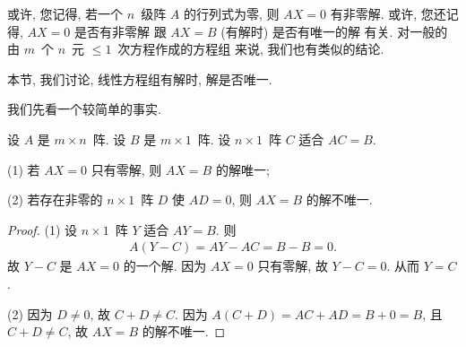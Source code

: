 或许, 您记得,
若一个 \(n\)~级阵 \(A\) 的行列式为零,
则 \(AX = 0\) 有非零解.
或许, 您还记得,
\(AX = 0\) 是否有非零解%
跟 \(AX = B\) (有解时) 是否有唯一的解%
有关.
对一般的%
由 \(m\)~个 \(n\)~元 \({\leq} 1\)~次方程作成的方程组%
来说, 我们也有类似的结论.

本节, 我们讨论, 线性方程组有解时, 解是否唯一.

我们先看一个较简单的事实.

\begin{theorem}
    设 \(A\) 是 \(m \times n\)~阵.
    设 \(B\) 是 \(m \times 1\)~阵.
    设 \(n \times 1\)~阵 \(C\) 适合 \(AC = B\).

    (1)
    若 \(AX = 0\) 只有零解, 则 \(AX = B\) 的解唯一;

    (2)
    若存在非零的 \(n \times 1\)~阵 \(D\)
    使 \(AD = 0\),
    则 \(AX = B\) 的解不唯一.
\end{theorem}

\begin{proof}
    (1)
    设 \(n \times 1\)~阵 \(Y\) 适合 \(AY = B\).
    则
    \begin{align*}
        A(Y - C) = AY - AC = B - B = 0.
    \end{align*}
    故 \(Y - C\) 是 \(AX = 0\) 的一个解.
    因为 \(AX = 0\) 只有零解,
    故 \(Y - C = 0\).
    从而 \(Y = C\).



    (2)
    因为 \(D \neq 0\), 故 \(C + D \neq C\).
    因为 \(A(C + D) = AC + AD = B + 0 = B\),
    且 \(C + D \neq C\),
    故 \(AX = B\) 的解不唯一.
\end{proof}

